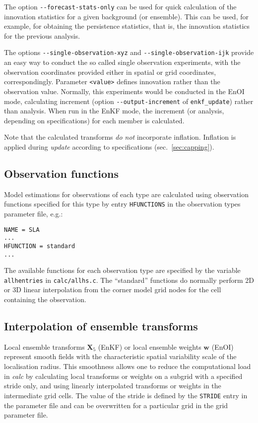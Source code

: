 \documentclass[11pt]{report}
\newcommand{\mb} {\mathbf}
\begin{document}
The option \verb|--forecast-stats-only| can be used for quick calculation of the innovation statistics for a given background (or ensemble).
This can be used, for example, for obtaining the persistence statistics, that is, the innovation statistics for the previous analysis.

The options \verb|--single-observation-xyz| and \verb|--single-observation-ijk| provide an easy way to conduct the so called single observation experiments, with the observation coordinates provided either in spatial or grid coordinates, correspondingly.
Parameter \verb|<value>| defines innovation rather than the observation value.
Normally, this experiments would be conducted in the EnOI mode, calculating increment (option \verb|--output-increment| of \verb|enkf_update|) rather than analysis.
When run in the EnKF mode, the increment (or analysis, depending on specifications) for each member is calculated.

Note that the calculated transforms \emph{do not} incorporate inflation.
Inflation is applied during \emph{update} according to specifications (sec.~\ref{sec:capping}).

\subsection{Observation functions}
\label{sec:hfunctions}

Model estimations for observations of each type are calculated using observation functions specified for this type by entry \verb|HFUNCTIONS| in the observation types parameter file, e.g.:
\begin{Verbatim}[frame=single,fontsize=\footnotesize]
NAME = SLA
...
HFUNCTION = standard
...
\end{Verbatim}
The available functions for each observation type are specified by the variable \verb|allhentries| in \verb|calc/allhs.c|.
The ``standard'' functions do normally perform 2D or 3D linear interpolation from the corner model grid nodes for the cell containing the observation.

\subsection{Interpolation of ensemble transforms}

Local ensemble transforms $\mb X_5$ (EnKF) or local ensemble weights $\mb w$ (EnOI) represent smooth fields with the characteristic spatial variability scale of the localisation radius.
This smoothness allows one to reduce the computational load in \emph{calc} by calculating local transforms or weights on a subgrid with a specified stride only, and using linearly interpolated transforms or weights in the intermediate grid cells.
The value of the stride is defined by the \verb|STRIDE| entry in the parameter file and can be overwritten for a particular grid in the grid parameter file.
\end{document}
